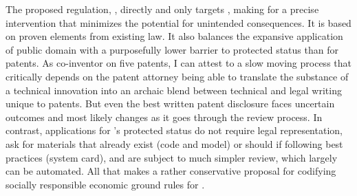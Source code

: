The proposed regulation, , directly and only targets , making for a
precise intervention that minimizes the potential for unintended consequences.
It is based on proven elements from existing  law. It also balances the
expansive application of public domain with a purposefully lower barrier to
protected status than for patents. As co-inventor on five patents, I can attest
to a slow moving process that critically depends on the patent attorney being
able to translate the substance of a technical innovation into an archaic blend
between technical and legal writing unique to patents. But even the best written
patent disclosure faces uncertain outcomes and most likely changes as it goes
through the review process. In contrast, applications for 's protected
status do not require legal representation, ask for materials that already exist
(code and model) or should if following best practices (system card), and are
subject to much simpler review, which largely can be automated. All that makes
 a rather conservative proposal for codifying socially responsible economic
ground rules for .
